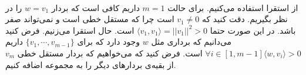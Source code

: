 \\
از استقرا استفاده می‌کنیم. برای حالت
$m=1$
داریم کافی است که بردار
$w = v_1$
را در نظر بگیریم. دقت کنید که
$v_1 \neq 0$
است چرا که مستقل خطی است و نمی‌تواند صفر باشد.
در این صورت حتما
$\langle v_1, v_1 \rangle = ||v_1||^2 > 0$
است.
حال استقرا می‌زنیم. فرض کنید می‌دانیم که برداری مثل
$w$
وجود دارد که برای
$\lbrace v_1, \cdots, v_{m-1} \rbrace$
داریم
$\forall i \in [1, m-1] \langle w, v_i \rangle > 0$
است.
فرض کنید که می‌خواهیم که بردار مستقل خطی
$v_m$
از بقیه‌ی بردار‌های دیگر را به مجموعه اضافه کنیم.




